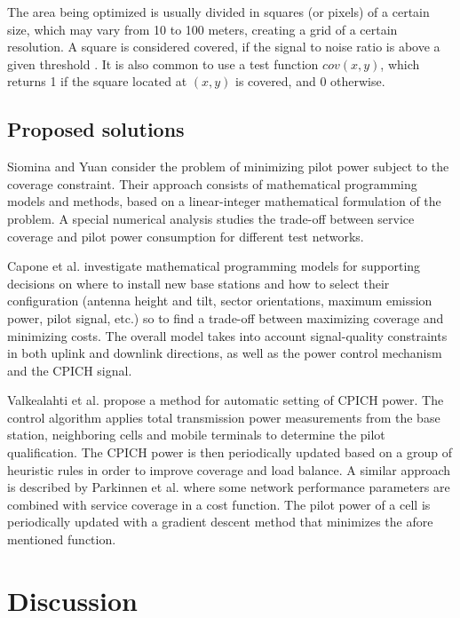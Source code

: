 The area being optimized is usually divided in squares (or pixels)
of a certain size, which may vary from 10 to 100 meters, creating
a grid of a certain resolution. A square is considered covered, if
the signal to noise ratio is above a given threshold \cite{3GPP_TS_25.133}.
It is also common to use a test function $cov(x,y)$, which returns
1 if the square located at $(x,y)$ is covered, and 0 otherwise.


\subsection{Proposed solutions}

Siomina and Yuan \cite{Siomina:Minimum.pilot.power.for.service.coverage}
consider the problem of minimizing pilot power subject to the coverage
constraint. Their approach consists of mathematical programming models
and methods, based on a linear-integer mathematical formulation of
the problem. A special numerical analysis studies the trade-off between
service coverage and pilot power consumption for different test networks.

Capone et al. \cite{Amaldi:Radio.planning.and.coveraga.optimization}
investigate mathematical programming models for supporting decisions
on where to install new base stations and how to select their configuration
(antenna height and tilt, sector orientations, maximum emission power,
pilot signal, etc.) so to find a trade-off between maximizing coverage
and minimizing costs. The overall model takes into account signal-quality
constraints in both uplink and downlink directions, as well as the
power control mechanism and the CPICH signal.

Valkealahti et al. \cite{Coverage.balance:2002} propose a method
for automatic setting of CPICH power. The control algorithm applies
total transmission power measurements from the base station, neighboring
cells and mobile terminals to determine the pilot qualification. The
CPICH power is then periodically updated based on a group of heuristic
rules in order to improve coverage and load balance. A similar approach
is described by Parkinnen et al. \cite{Coverage.optimization.with.cost.function:2002}
where some network performance parameters are combined with service
coverage in a cost function. The pilot power of a cell is periodically
updated with a gradient descent method that minimizes the afore mentioned
function.


\section{Discussion}

